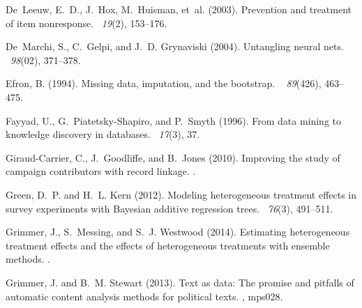 \documentclass[10pt]{book}
\theoremstyle{definition}
\begin{document}
\begin{thebibliography}{11}
De~Leeuw, E.~D., J.~Hox, M.~Huisman, et~al. (2003).
\newblock Prevention and treatment of item nonresponse.
~{\em 19\/}(2), 153--176.

De~Marchi, S., C.~Gelpi, and J.~D. Grynaviski (2004).
\newblock Untangling neural nets.
~{\em 98\/}(02), 371--378.

Efron, B. (1994).
\newblock Missing data, imputation, and the bootstrap.
~{\em
  89\/}(426), 463--475.

Fayyad, U., G.~Piatetsky-Shapiro, and P.~Smyth (1996).
\newblock From data mining to knowledge discovery in databases.
~{\em 17\/}(3), 37.

Giraud-Carrier, C., J.~Goodliffe, and B.~Jones (2010).
\newblock Improving the study of campaign contributors with record linkage.
.

Green, D.~P. and H.~L. Kern (2012).
\newblock Modeling heterogeneous treatment effects in survey experiments with
  {B}ayesian additive regression trees.
~{\em 76\/}(3), 491--511.

Grimmer, J., S.~Messing, and S.~J. Westwood (2014).
\newblock Estimating heterogeneous treatment effects and the effects of
  heterogeneous treatments with ensemble methods.
.

Grimmer, J. and B.~M. Stewart (2013).
\newblock Text as data: The promise and pitfalls of automatic content analysis
  methods for political texts.
, mps028.


\end{thebibliography}
\end{document}
